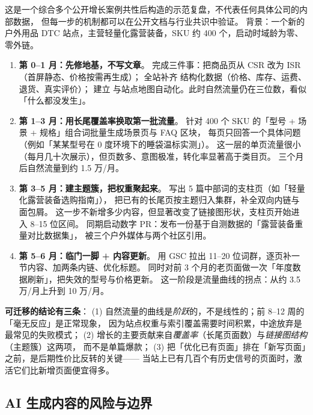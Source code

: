 \begin{casebox}
这是一个综合多个公开增长案例共性后构造的示范复盘，不代表任何具体公司的内部数据，
但每一步的机制都可以在公开文档与行业共识中验证。
背景：一个新的户外用品 DTC 站点，主营轻量化露营装备，SKU 约 400 个，启动时域龄为零、零外链。

\begin{enumerate}
  \item \textbf{第 0--1 月：先修地基，不写文章}。
        完成三件事：把商品页从 CSR 改为 ISR（首屏静态、价格按需再生成）；
        全站补齐  结构化数据（价格、库存、运费、退货、真实评价）；
        建立  与站点地图自动化。此时自然流量仍在三位数，看似「什么都没发生」。
  \item \textbf{第 1--3 月：用长尾覆盖率换取第一批流量}。
        针对 400 个 SKU 的「型号 + 场景 + 规格」组合词批量生成场景页与 FAQ 区块，
        每页只回答一个具体问题（例如「某某型号在 0 度环境下的睡袋温标实测」）。
        这一层的单页流量很小（每月几十次展示），但页数多、意图极准，转化率显著高于类目页。
        三个月后自然流量到约 1.5 万/月。
  \item \textbf{第 3--5 月：建主题簇，把权重聚起来}。
        写出 5 篇中部词的支柱页（如「轻量化露营装备选购指南」），
        把已有的长尾页按主题归入集群，补全双向内链与面包屑。
        这一步不新增多少内容，但显著改变了链接图形状，支柱页开始进入 8--15 位区间。
        同期启动数字 PR：发布一份基于自测数据的「露营装备重量对比数据集」，
        被三个户外媒体与两个社区引用。
  \item \textbf{第 5--6 月：临门一脚 + 内容更新}。
        用 GSC 拉出 11--20 位词群，逐页补一节内容、加两条内链、优化标题。
        同时对前 3 个月的老页面做一次「年度数据刷新」，把失效的型号与价格更新。
        这一阶段是流量曲线的拐点：从约 3.5 万/月上升到 10 万/月。
\end{enumerate}

\textbf{可迁移的结论有三条}：
(1) 自然流量的曲线是\emph{阶跃}的，不是线性的；前 8--12 周的「毫无反应」是正常现象，
因为站点权重与索引覆盖需要时间积累，中途放弃是最常见的失败模式；
(2) 增长的主要贡献来自\emph{覆盖率}（长尾页面数）与\emph{链接图结构}（主题簇）这两项，
而不是单篇爆款；
(3) 把「优化已有页面」排在「新写页面」之前，是后期性价比反转的关键——
当站上已有几百个有历史信号的页面时，激活它们比新增页面便宜得多。
\end{casebox}

\subsection{AI 生成内容的风险与边界}

